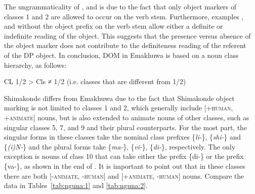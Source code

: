 \documentclass[output=paper]{langsci/langscibook}
\begin{document}
The ungrammaticality of ,  and  is due to the fact that only object markers of classes 1 and 2 are allowed to occur on the verb stem. Furthermore, examples ,  and  without the object prefix on the verb stem allow either a definite or indefinite reading of the object. This suggests that the presence versus absence of the object marker does not contribute to the definiteness reading of the referent of the DP object. In conclusion, DOM in Emakhuwa is based on a noun class hierarchy, as follows:

\ea\label{ex:nguna:}
 CL 1/2 > Cls ≠ 1/2 (i.e. classes that are different from 1/2)
\z

{Shimakonde differs from Emakhuwa due to the fact that Shimakonde object marking is not limited to classes 1 and 2, which generally include [+}{\textsc{human}}{, +}{\textsc{animate}}{] nouns, but is also extended to animate nouns of other classes, such as singular classes 5, 7, and 9 and their plural counterparts.} {For the most part, }{the singular forms in these classes take the nominal class prefixes \{}{\textit{li-}}{\}, \{}{\textit{shi-}}{\} and \{}{\textit{(i)N-}}{\} and the plural forms take \{}{\textit{ma-}}{\}, \{}{\textit{vi-}}{\}, \{}{\textit{di-}}{\}, respectively. The only exception is nouns of class 10 that can take either the prefix \{di-\} or the prefix \{va-\}, as shown in the end of . }{It is important to point out that} {in these classes there are both [-}{\textsc{animate, -human}}{] and [+}{\textsc{animate, -human}}{] nouns. Compare the data in Tables~\ref{tab:nguna:1} and \ref{tab:nguna:2}.}
\end{document}
